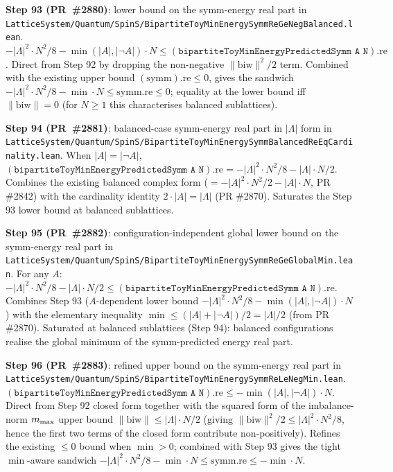 \documentclass[a4paper,11pt]{article}
\begin{document}
\textbf{Step 93 (PR~\#2880)}: lower bound on the symm-energy real
part in
\texttt{LatticeSystem/Quantum/SpinS/BipartiteToyMinEnergySymmReGeNegBalanced.lean}.
$-|\Lambda|^2\cdot N^2/8 - \min(|A|, |\neg A|)\cdot N \le
   (\texttt{bipartiteToyMinEnergyPredictedSymm A N}).\mathrm{re}$.
Direct from Step 92 by dropping the non-negative
$\|\mathrm{biw}\|^2/2$ term. Combined with the existing upper bound
$(\mathrm{symm}).\mathrm{re} \le 0$, gives the sandwich
$-|\Lambda|^2\cdot N^2/8 - \min\cdot N \le \mathrm{symm.re} \le 0$;
equality at the lower bound iff $\|\mathrm{biw}\| = 0$
(for $N \ge 1$ this characterises balanced sublattices).

\textbf{Step 94 (PR~\#2881)}: balanced-case symm-energy real part in
$|\Lambda|$ form in
\texttt{LatticeSystem/Quantum/SpinS/BipartiteToyMinEnergySymmBalancedReEqCardinality.lean}.
When $|A| = |\neg A|$,
$(\texttt{bipartiteToyMinEnergyPredictedSymm A N}).\mathrm{re}
   = -|\Lambda|^2\cdot N^2/8 - |\Lambda|\cdot N/2$.
Combines the existing balanced complex form
($= -|A|^2\cdot N^2/2 - |A|\cdot N$, PR \#2842) with the cardinality
identity $2\cdot|A| = |\Lambda|$ (PR \#2870). Saturates the
Step 93 lower bound at balanced sublattices.

\textbf{Step 95 (PR~\#2882)}: configuration-independent global lower
bound on the symm-energy real part in
\texttt{LatticeSystem/Quantum/SpinS/BipartiteToyMinEnergySymmReGeGlobalMin.lean}.
For any $A$:
$-|\Lambda|^2\cdot N^2/8 - |\Lambda|\cdot N/2 \le
   (\texttt{bipartiteToyMinEnergyPredictedSymm A N}).\mathrm{re}$.
Combines Step 93 ($A$-dependent lower bound
$-|\Lambda|^2\cdot N^2/8 - \min(|A|, |\neg A|)\cdot N$) with the
elementary inequality $\min \le (|A|+|\neg A|)/2 = |\Lambda|/2$
(from PR \#2870). Saturated at balanced sublattices (Step 94):
balanced configurations realise the global minimum of the
symm-predicted energy real part.

\textbf{Step 96 (PR~\#2883)}: refined upper bound on the symm-energy
real part in
\texttt{LatticeSystem/Quantum/SpinS/BipartiteToyMinEnergySymmReLeNegMin.lean}.
$(\texttt{bipartiteToyMinEnergyPredictedSymm A N}).\mathrm{re}
   \le -\min(|A|, |\neg A|)\cdot N$.
Direct from Step 92 closed form together with the squared form of
the imbalance-norm $m_{\rm max}$ upper bound
$\|\mathrm{biw}\| \le |\Lambda|\cdot N/2$ (giving
$\|\mathrm{biw}\|^2/2 \le |\Lambda|^2\cdot N^2/8$, hence the first
two terms of the closed form contribute non-positively).
Refines the existing $\le 0$ bound when $\min > 0$; combined with
Step 93 gives the tight $\min$-aware sandwich
$-|\Lambda|^2\cdot N^2/8 - \min\cdot N \le \mathrm{symm.re} \le
  -\min\cdot N$.
\end{document}
